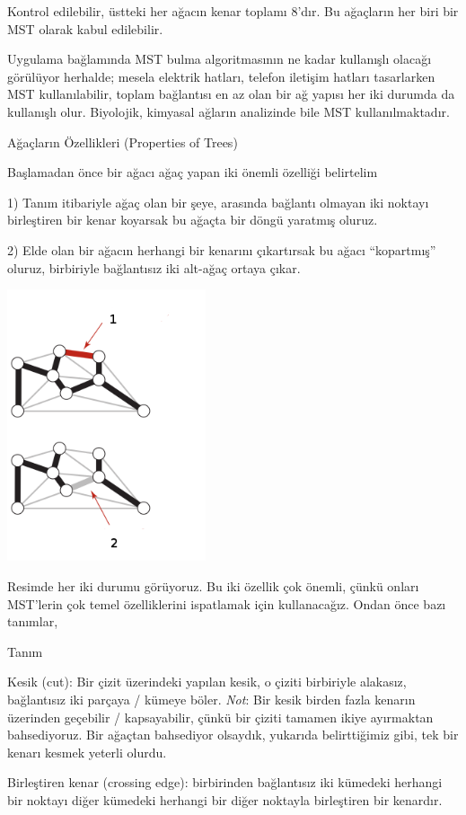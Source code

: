 \documentclass[12pt,fleqn]{article}\usepackage{../../common}
\begin{document}
Kontrol edilebilir, üstteki her ağacın kenar toplamı 8'dır. Bu ağaçların
her biri bir MST olarak kabul edilebilir.

Uygulama bağlamında MST bulma algoritmasının ne kadar kullanışlı olacağı
görülüyor herhalde; mesela elektrik hatları, telefon iletişim hatları
tasarlarken MST kullanılabilir, toplam bağlantısı en az olan bir ağ yapısı
her iki durumda da kullanışlı olur. Biyolojik, kimyasal ağların analizinde
bile MST kullanılmaktadır.

Ağaçların Özellikleri (Properties of Trees)

Başlamadan önce bir ağacı ağaç yapan iki önemli özelliği belirtelim

1) Tanım itibariyle ağaç olan bir şeye, arasında bağlantı olmayan iki
noktayı birleştiren bir kenar koyarsak bu ağaçta bir döngü yaratmış
oluruz.

2) Elde olan bir ağacın herhangi bir kenarını çıkartırsak bu ağacı
``kopartmış'' oluruz, birbiriyle bağlantısız iki alt-ağaç ortaya çıkar.

\includegraphics[height=8cm]{graph_prop.png}

Resimde her iki durumu görüyoruz. Bu iki özellik çok önemli, çünkü onları
MST'lerin çok temel özelliklerini ispatlamak için kullanacağız. Ondan önce
bazı tanımlar,

Tanım

Kesik (cut): Bir çizit üzerindeki yapılan kesik, o çiziti birbiriyle
alakasız, bağlantısız iki parçaya / kümeye böler. {\em Not}: Bir kesik
birden fazla kenarın üzerinden geçebilir / kapsayabilir, çünkü bir çiziti
tamamen ikiye ayırmaktan bahsediyoruz. Bir ağaçtan bahsediyor olsaydık,
yukarıda belirttiğimiz gibi, tek bir kenarı kesmek yeterli olurdu.

Birleştiren kenar (crossing edge): birbirinden bağlantısız iki kümedeki
herhangi bir noktayı diğer kümedeki herhangi bir diğer noktayla birleştiren
bir kenardır.
\end{document}
